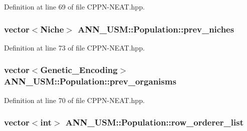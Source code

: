Definition at line 69 of file C\-P\-P\-N-\/\-N\-E\-A\-T.\-hpp.

\hypertarget{class_a_n_n___u_s_m_1_1_population_a1103c56991771d6ccae5e1cccaf51db9}{
\subsubsection[{prev\-\_\-niches}]{\setlength{\rightskip}{0pt plus 5cm}vector$<${\bf Niche}$>$ A\-N\-N\-\_\-\-U\-S\-M\-::\-Population\-::prev\-\_\-niches}}\label{class_a_n_n___u_s_m_1_1_population_a1103c56991771d6ccae5e1cccaf51db9}


Definition at line 73 of file C\-P\-P\-N-\/\-N\-E\-A\-T.\-hpp.

\hypertarget{class_a_n_n___u_s_m_1_1_population_ad1ba3ace7157e2763976a1ee1155584b}{
\subsubsection[{prev\-\_\-organisms}]{\setlength{\rightskip}{0pt plus 5cm}vector$<${\bf Genetic\-\_\-\-Encoding}$>$ A\-N\-N\-\_\-\-U\-S\-M\-::\-Population\-::prev\-\_\-organisms}}\label{class_a_n_n___u_s_m_1_1_population_ad1ba3ace7157e2763976a1ee1155584b}


Definition at line 70 of file C\-P\-P\-N-\/\-N\-E\-A\-T.\-hpp.

\hypertarget{class_a_n_n___u_s_m_1_1_population_ae688b66299b4b8be34d34a797bbc44ab}{
\subsubsection[{row\-\_\-orderer\-\_\-list}]{\setlength{\rightskip}{0pt plus 5cm}vector$<$int$>$ A\-N\-N\-\_\-\-U\-S\-M\-::\-Population\-::row\-\_\-orderer\-\_\-list}}\label{class_a_n_n___u_s_m_1_1_population_ae688b66299b4b8be34d34a797bbc44ab}


